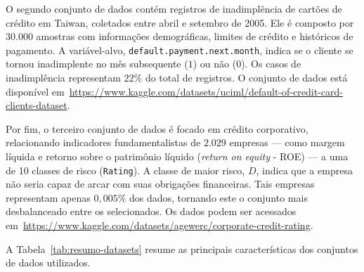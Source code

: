 O segundo conjunto de dados contém registros de inadimplência de cartões de crédito em Taiwan, coletados entre abril e setembro de 2005. Ele é composto por \(30.000\) amostras com informações demográficas, limites de crédito e históricos de pagamento. A variável-alvo, \texttt{default.payment.next.month}, indica se o cliente se tornou inadimplente no mês subsequente (\(1\)) ou não (\(0\)). Os casos de inadimplência representam \(22\%\) do total de registros. O conjunto de dados está disponível em~\url{https://www.kaggle.com/datasets/uciml/default-of-credit-card-clients-dataset}.

Por fim, o terceiro conjunto de dados é focado em crédito corporativo, relacionando indicadores fundamentalistas de \(2.029\) empresas — como margem líquida e retorno sobre o patrimônio líquido (\textit{return on equity} - ROE) — a uma de 10 classes de risco (\texttt{Rating}). A classe de maior risco, \(D\), indica que a empresa não seria capaz de arcar com suas obrigações financeiras. Tais empresas representam apenas \(0,005\%\) dos dados, tornando este o conjunto mais desbalanceado entre os selecionados. Os dados podem ser acessados em~\url{https://www.kaggle.com/datasets/agewerc/corporate-credit-rating}.

A Tabela~\ref{tab:resumo-datasets} resume as principais características dos conjuntos de dados utilizados.

\begin{table}[h]
  \centering
  \caption{Características dos conjuntos de dados}
  \label{tab:resumo-datasets}
\end{table}

